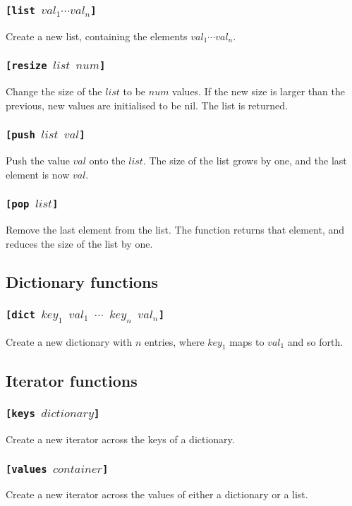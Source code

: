 \subsubsection{\tt{[list }$val_1\cdots val_n$\tt{]}}
Create a new list, containing the elements $val_1\cdots val_n$.

\subsubsection{\tt{[resize }$list$ $num$\tt{]}}
Change the size of the $list$ to be $num$ values. If the new size is larger than the previous, new values are initialised to be nil. The list is returned.

\subsubsection{\tt{[push }$list$ $val$\tt{]}}
Push the value $val$ onto the $list$. The size of the list grows by one, and the last element is now $val$.

\subsubsection{\tt{[pop }$list$\tt{]}}
Remove the last element from the list. The function returns that element, and reduces the size of the list by one.

\subsection{Dictionary functions}
\subsubsection{\tt{[dict }$key_1$  $val_1$ $\cdots$ $key_n$ $val_n$\tt{]}}
Create a new dictionary with $n$ entries, where $key_1$ maps to $val_1$ and so forth.

\subsection{Iterator functions}
\subsubsection{\tt{[keys }$dictionary$\tt{]}}
Create a new iterator across the keys of a dictionary.
\subsubsection{\tt{[values }$container$\tt{]}}
Create a new iterator across the values of either a dictionary or a list.
